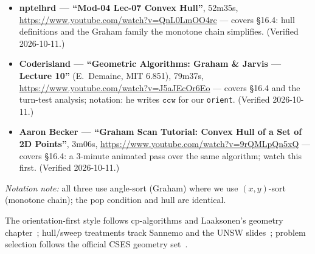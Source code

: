 \begin{rulebox}
\begin{itemize}
\item \textbf{nptelhrd --- ``Mod-04 Lec-07 Convex Hull''},
52m35s, \url{https://www.youtube.com/watch?v=QnL0LmOO4rc} ---
covers \S16.4: hull definitions and the Graham family the
monotone chain simplifies. (Verified 2026-10-11.)
\item \textbf{Coderisland --- ``Geometric Algorithms: Graham \&
Jarvis --- Lecture 10''} (E.~Demaine, MIT 6.851),
79m37s, \url{https://www.youtube.com/watch?v=J5aJEcOr6Eo} ---
covers \S16.4 and the turn-test analysis; notation: he writes
$\texttt{ccw}$ for our \texttt{orient}. (Verified 2026-10-11.)
\item \textbf{Aaron Becker --- ``Graham Scan Tutorial: Convex
Hull of a Set of 2D Points''}, 3m06s,
\url{https://www.youtube.com/watch?v=9rQMLpQn5xQ} --- covers
\S16.4: a 3-minute animated pass over the same algorithm; watch
this first. (Verified 2026-10-11.)
\end{itemize}
\emph{Notation note:} all three use angle-sort (Graham) where we
use $(x,y)$-sort (monotone chain); the pop condition and hull
are identical.
\end{rulebox}
The orientation-first style follows cp-algorithms and
Laaksonen's geometry chapter~\cite{cpalgorithms,laaksonen2024};
hull/sweep treatments track Sannemo and the UNSW
slides~\cite{sannemo2025,usacoguide}; problem selection follows
the official CSES geometry set~\cite{cses}.
